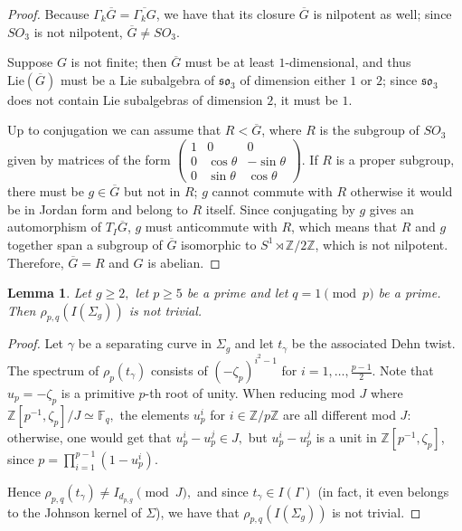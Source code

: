 \documentclass[12pt]{amsart}
\newtheorem{lem}[thm]{Lemma}
\theoremstyle{definition}
\newcommand{\Z}{\mathbb{Z}}
\begin{document}
\begin{proof}
	Because $\Gamma_k \overline{G}=\overline{\Gamma_k G}$, we have that its closure $\overline{G}$ is nilpotent as well; since $SO_3$ is not nilpotent, $\overline{G}\neq SO_3$.
	
	Suppose $G$ is not finite; then $\overline{G}$ must be at least $1$-dimensional, and thus $\textrm{Lie}\left(\overline{G}\right)$ must be a Lie subalgebra of $\mathfrak{so}_3$ of dimension either $1$ or $2$; since $\mathfrak{so}_3$ does not contain Lie subalgebras of dimension $2$, it must be $1$. 
	
	Up to conjugation we can assume that $R<\overline{G}$, where $R$ is the subgroup of $SO_3$ given by matrices of the form $\begin{pmatrix}
	1 & 0 & 0 \\ 0 & \cos\theta & -\sin\theta \\ 0 & \sin\theta & \cos\theta
	\end{pmatrix}$. If $R$ is a proper subgroup, there must be $g\in \overline{G}$ but not in $R$; $g$ cannot commute with $R$ otherwise it would be in Jordan form and belong to $R$ itself. Since conjugating by $g$ gives an automorphism of $T_I \overline{G}$, $g$ must anticommute with $R$, which means that $R$ and $g$ together span a subgroup of $\overline{G}$ isomorphic to $S^1\rtimes \Z/2\Z$, which is not nilpotent. Therefore, $\overline{G}=R$ and $G$ is abelian.
	
	
\end{proof}
\fi
\begin{lem}\label{lem:nonTrivialTorelli}
	Let $g\geq 2,$ let $p\geq 5$ be a prime and let $q=1 \pmod{p}$ be a prime. Then $\rho_{p,q}(I(\Sigma_g))$ is not trivial.
\end{lem}
\begin{proof}
	Let $\gamma$ be a separating curve in $\Sigma_g$ and let $t_{\gamma}$ be the associated Dehn twist. The spectrum of $\rho_p(t_{\gamma})$ consists of $(-\zeta_p)^{i^2-1}$ for $i=1,\ldots,\frac{p-1}{2}.$ Note that $u_p=-\zeta_p$ is a primitive $p$-th root of unity. When reducing mod $J$ where $\Z[p^{-1},\zeta_p]/J\simeq \mathbb{F}_q,$ the elements $u_p^i$ for $i\in \Z/p\Z$ are all different mod $J:$ otherwise, one would get that $u_p^i-u_p^j\in J,$ but $u_p^i-u_p^j$ is a unit in $\Z[p^{-1},\zeta_p]$, since $p=\prod_{i=1}^{p-1}(1-u_p^i)$.
	
	Hence $\rho_{p,q}(t_{\gamma})\neq I_{d_{p,g}} \pmod{ J},$ and since $t_{\gamma}\in I(\Gamma)$ (in fact, it even belongs to the Johnson kernel of $\Sigma$), we have that $\rho_{p,q}(I(\Sigma_g))$ is not trivial.
\end{proof}
\end{document}
